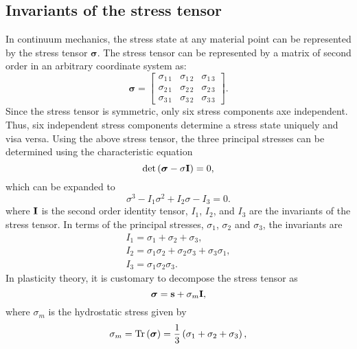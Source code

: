 \subsection{Invariants of the stress tensor}
In continuum mechanics, the stress state at any material point can be represented by the stress tensor $\bm{\sigma}$.
The stress tensor can be represented by a matrix of second order in an arbitrary coordinate system as:
\begin{equation}
\bm{\sigma} =
  \begin{bmatrix}
    \sigma_{1\,1}& \sigma_{1\,2}& \sigma_{1\,3}\\
    \sigma_{2\,1}& \sigma_{2\,2}& \sigma_{2\,3}\\
    \sigma_{3\,1}& \sigma_{3\,2}& \sigma_{3\,3}
  \end{bmatrix}.
\end{equation}
Since the stress tensor is symmetric, only six stress components axe independent.
Thus, six independent stress components determine a stress state uniquely and visa versa.
Using the above stress tensor, the three principal stresses can be determined using the characteristic equation
\begin{equation}
\det \left( {{\bm{\sigma }} - \sigma {\bf{I}}} \right) = 0,
\end{equation}
which can be expanded to
\begin{equation}
{\sigma ^3} - {I_1}{\sigma ^2} + {I_2}\sigma  - {I_3} = 0.
\end{equation}
where $\bf{I}$ is the second order identity tensor, ${I_1}$, ${I_2}$, and ${I_3}$ are the invariants of the stress tensor.
In terms of the principal stresses, $\sigma_1$, $\sigma_2$ and $\sigma_3$, the invariants are
\begin{equation}
\begin{array}{*{20}{l}}
{{I_1} = {\sigma _1} + {\sigma _2} + {\sigma _3}},\\
{{I_2} = {\sigma _1}{\sigma _2} + {\sigma _2}{\sigma _3} + {\sigma _3}{\sigma _1}},\\
{{I_3} = {\sigma _1}{\sigma _2}{\sigma _3}}.
\end{array}
\end{equation}
In plasticity theory, it is customary to decompose the stress tensor as
\begin{equation}
{\bm{\sigma }} = {\bf{s}} + {\sigma _m}{\bf{I}},
\end{equation}
where $\sigma_m$ is the hydrostatic stress given by
\begin{equation}
{\sigma _m} = {\rm{Tr}}\left( {\bm{\sigma }} \right) = \frac{1}{3}\left( {{\sigma _1} + {\sigma _2} + {\sigma _3}} \right),
\end{equation}
